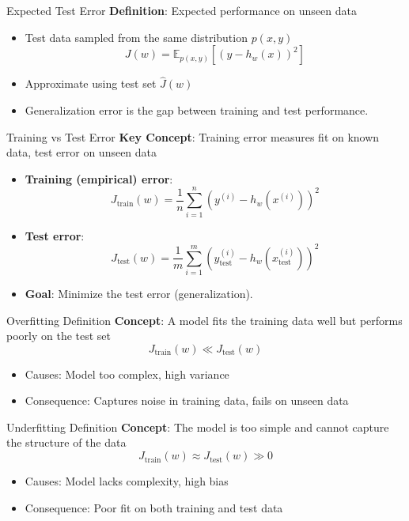 \documentclass[serif, aspectratio=169]{beamer}
\begin{document}
\begin{frame}{Expected Test Error}
    \textbf{Definition}: Expected performance on unseen data
    \begin{itemize}
        \item Test data sampled from the same distribution \( p(x, y) \)
        \[
        J(w) = \mathbb{E}_{p(x,y)}[(y - h_w(x))^2]
        \]
        \item Approximate using test set \( \hat{J}(w) \)
        \item Generalization error is the gap between training and test performance.
    \end{itemize}
\end{frame}

\begin{frame}{Training vs Test Error}
    \textbf{Key Concept}: Training error measures fit on known data, test error on unseen data
    \begin{itemize}
        \item \textbf{Training (empirical) error}:
        \[
        J_{\text{train}}(w) = \frac{1}{n} \sum_{i=1}^{n} \left( y^{(i)} - h_w(x^{(i)}) \right)^2
        \]
        \item \textbf{Test error}:
        \[
        J_{\text{test}}(w) = \frac{1}{m} \sum_{i=1}^{m} \left(y_{\text{test}}^{(i)} - h_w(x_{\text{test}}^{(i)})\right)^2
        \]
        \item \textbf{Goal}: Minimize the test error (generalization).
    \end{itemize}
\end{frame}

\begin{frame}{Overfitting Definition}
    \textbf{Concept}: A model fits the training data well but performs poorly on the test set
    \[
    J_{\text{train}}(w) \ll J_{\text{test}}(w)
    \]
    \begin{itemize}
        \item Causes: Model too complex, high variance
        \item Consequence: Captures noise in training data, fails on unseen data
    \end{itemize}
\end{frame}

\begin{frame}{Underfitting Definition}
    \textbf{Concept}: The model is too simple and cannot capture the structure of the data
    \[
    J_{\text{train}}(w) \approx J_{\text{test}}(w) \gg 0
    \]
    \begin{itemize}
        \item Causes: Model lacks complexity, high bias
        \item Consequence: Poor fit on both training and test data
    \end{itemize}
\end{frame}
\end{document}
